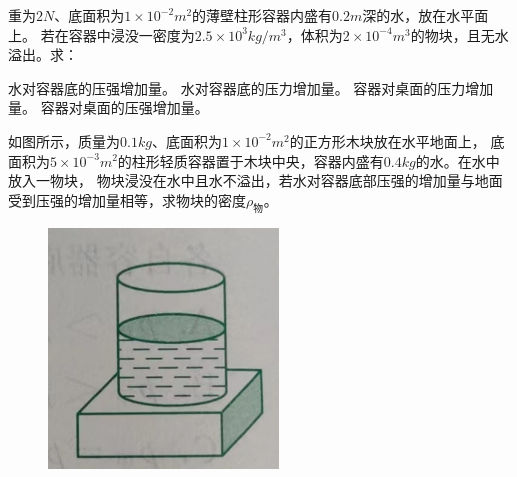 \documentclass[a4paper,cs4size]{BHCexam}
\begin{document}
\begin{groups}
\begin{questions}[]
        \question[5] 重为$2N$、底面积为$1\times 10^{-2}m^2$的薄壁柱形容器内盛有$0.2m$深的水，放在水平面上。
        若在容器中浸没一密度为$2.5\times 10^3kg/m^3$，体积为$2\times 10^{-4}m^3$的物块，且无水溢出。求：
        \begin{subquestions}
            \subquestion 水对容器底的压强增加量。
            \subquestion 水对容器底的压力增加量。
            \subquestion 容器对桌面的压力增加量。
            \subquestion 容器对桌面的压强增加量。
        \end{subquestions}
        \vspace{6.5cm}

        \question[5] 如图所示，质量为$0.1kg$、底面积为$1\times 10^{-2}m^2$的正方形木块放在水平地面上，
        底面积为$5\times 10^{-3}m^2$的柱形轻质容器置于木块中央，容器内盛有$0.4kg$的水。在水中放入一物块，
        物块浸没在水中且水不溢出，若水对容器底部压强的增加量与地面受到压强的增加量相等，求物块的密度$\rho_{\text{物}}$。
        \begin{figure}[htb]
            \flushright
            \includegraphics [scale=0.4,trim=0 0 0 0]{./image/physics_pressure_8.png}
            \label{fig:fig_pressure_8}
        \end{figure}
        \vspace{6.5cm}


\end{questions}
\end{groups}
\end{document}
